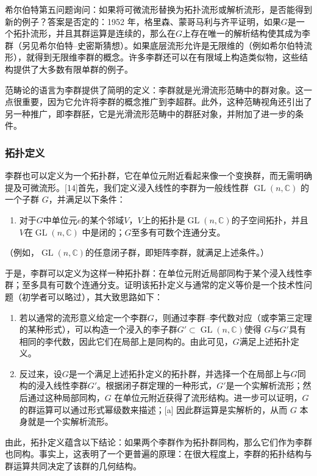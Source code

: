 希尔伯特第五问题询问：如果将可微流形替换为拓扑流形或解析流形，是否能得到新的例子？答案是否定的：1952 年，格里森、蒙哥马利与齐平证明，如果$G$是一个拓扑流形，并且其群运算是连续的，那么在$G$上存在唯一的解析结构使其成为李群（另见希尔伯特–史密斯猜想）。如果底层流形允许是无限维的（例如希尔伯特流形），就得到无限维李群的概念。许多李群还可以在有限域上构造类似物，这些结构提供了大多数有限单群的例子。

范畴论的语言为李群提供了简明的定义：李群就是光滑流形范畴中的群对象。这一点很重要，因为它允许将李群的概念推广到李超群。此外，这种范畴视角还引出了另一种推广，即李群胚，它是光滑流形范畴中的群胚对象，并附加了进一步的条件。
\subsubsection{拓扑定义}
李群也可以定义为一个拓扑群，它在单位元附近看起来像一个变换群，而无需明确提及可微流形。[14]首先，我们定义浸入线性的李群为一般线性群 $\operatorname{GL}(n,\mathbb{C})$ 的一个子群 $G$，并满足以下条件：
\begin{enumerate}
\item 对于$G$中单位元$e$的某个邻域$V$，$V$上的拓扑是$\operatorname{GL}(n,\mathbb{C})$的子空间拓扑，并且$V$在$\operatorname{GL}(n,\mathbb{C})$ 中是闭的；$G$至多有可数个连通分支。
\end{enumerate}
（例如，$\operatorname{GL}(n,\mathbb{C})$的任意闭子群，即矩阵李群，就满足上述条件。）

于是，李群可以定义为这样一种拓扑群：在单位元附近局部同构于某个浸入线性李群；至多具有可数个连通分支。证明该拓扑定义与通常的定义等价是一个技术性问题（初学者可以略过），其大致思路如下：
\begin{enumerate}
\item 若以通常的流形意义给定一个李群$G$，则通过李群–李代数对应（或李第三定理的某种形式），可以构造一个浸入的李子群$G' \subset \operatorname{GL}(n,\mathbb{C})$使得 $G$与$G'$具有相同的李代数，因此它们在局部上是同构的。由此可见，$G$满足上述拓扑定义。
\item 反过来，设$G$是一个满足上述拓扑定义的拓扑群，并选择一个在局部上与$G$同构的浸入线性李群$G'$。根据闭子群定理的一种形式，$G'$是一个实解析流形；然后通过这种局部同构，$G$ 在单位元附近获得了流形结构。进一步可以证明，$G$的群运算可以通过形式幂级数来描述；[a] 因此群运算是实解析的，从而 $G$ 本身就是一个实解析流形。
\end{enumerate}
由此，拓扑定义蕴含以下结论：如果两个李群作为拓扑群同构，那么它们作为李群也同构。事实上，这表明了一个更普遍的原理：在很大程度上，李群的拓扑结构与群运算共同决定了该群的几何结构。
